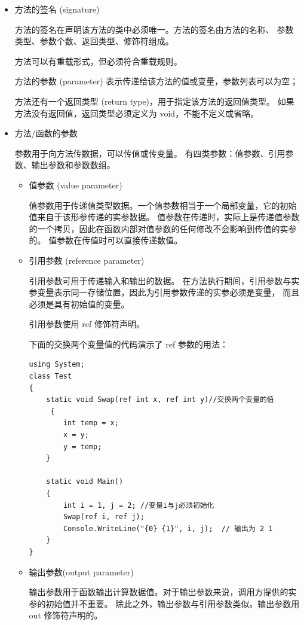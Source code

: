 \begin{itemize}
\item 方法的签名 (signature)

方法的签名在声明该方法的类中必须唯一。方法的签名由方法的名称、
参数类型、参数个数、返回类型、修饰符组成。

方法可以有重载形式，但必须符合重载规则。

方法的参数 (parameter) 表示传递给该方法的值或变量，参数列表可以为空；

方法还有一个返回类型 (return type)，用于指定该方法的返回值类型。
如果方法没有返回值，返回类型必须定义为 void，不能不定义或省略。

\item 方法/函数的参数

参数用于向方法传数据，可以传值或传变量。
有四类参数：值参数、引用参数、输出参数和参数数组。

    \begin{itemize}
	\item 值参数 (value parameter)

    值参数用于传递值类型数据。一个值参数相当于一个局部变量，它的初始值来自于该形参传递的实参数据。
    值参数在传递时，实际上是传递值参数的一个拷贝，因此在函数内部对值参数的任何修改不会影响到传值的实参的。
    值参数在传值时可以直接传递数值。

	\item 引用参数 (reference parameter)

    引用参数可用于传递输入和输出的数据。
    在方法执行期间，引用参数与实参变量表示同一存储位置，因此为引用参数传递的实参必须是变量，
    而且必须是具有初始值的变量。

    引用参数使用 ref 修饰符声明。

    下面的交换两个变量值的代码演示了 ref 参数的用法：

\begin{lstlisting}
using System;
class Test
{
    static void Swap(ref int x, ref int y)//交换两个变量的值
     {
        int temp = x;
        x = y;
        y = temp;
    }

    static void Main()
    {
        int i = 1, j = 2; //变量i与j必须初始化
        Swap(ref i, ref j);
        Console.WriteLine("{0} {1}", i, j);  // 输出为 2 1
    }
}
\end{lstlisting}


	\item 输出参数(output parameter)

    输出参数用于函数输出计算数据值。对于输出参数来说，调用方提供的实参的初始值并不重要。
    除此之外，输出参数与引用参数类似。输出参数用 out 修饰符声明的。


\end{itemize}
\end{itemize}
